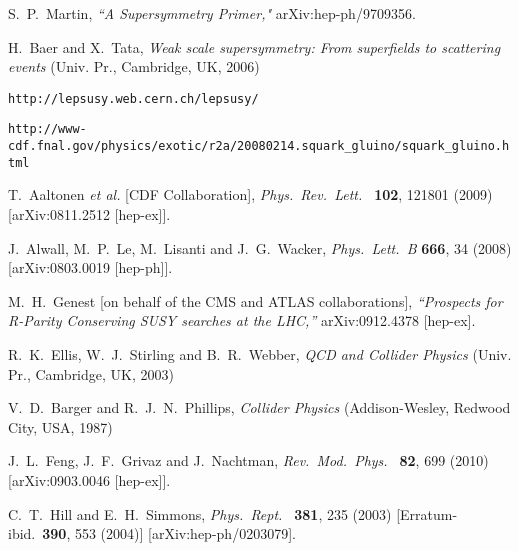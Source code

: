 \documentclass{ws-procs9x6}
\begin{document}
\begin{thebibliography}{99}
  S.~P.~Martin,
{\it ``A Supersymmetry Primer,"}
  arXiv:hep-ph/9709356.
  
  H.~Baer and X.~Tata,
{\it Weak scale supersymmetry: From superfields to scattering events}
(Univ. Pr., Cambridge, UK, 2006)  

{\tt http://lepsusy.web.cern.ch/lepsusy/}
  
{\tt  http://www-cdf.fnal.gov/physics/exotic/r2a/20080214.squark\_gluino/squark\_gluino.html}
  
  T.~Aaltonen {\it et al.}  [CDF Collaboration],
  {\em Phys.\ Rev.\ Lett.\ } {\bf 102}, 121801 (2009)
  [arXiv:0811.2512 [hep-ex]].
  
  J.~Alwall, M.~P.~Le, M.~Lisanti and J.~G.~Wacker,
{\em  Phys.\ Lett.\  B} {\bf 666}, 34 (2008)
  [arXiv:0803.0019 [hep-ph]].
  
  M.~H.~Genest  [on behalf of the CMS and ATLAS collaborations],
{\it ``Prospects for R-Parity Conserving SUSY searches at the LHC,''}
  arXiv:0912.4378 [hep-ex].
   
  R.~K.~Ellis, W.~J.~Stirling and B.~R.~Webber,
{\it QCD and Collider Physics} (Univ. Pr., Cambridge, UK, 2003)

  V.~D.~Barger and R.~J.~N.~Phillips,
{\it Collider Physics}
(Addison-Wesley, Redwood City, USA, 1987) 

  J.~L.~Feng, J.~F.~Grivaz and J.~Nachtman,
{\em  Rev.\ Mod.\ Phys.\ } {\bf 82}, 699 (2010)
  [arXiv:0903.0046 [hep-ex]].

 C.~T.~Hill and E.~H.~Simmons,
{\em  Phys.\ Rept.\ }  {\bf 381}, 235 (2003)
  [Erratum-ibid.\  {\bf 390}, 553 (2004)]
  [arXiv:hep-ph/0203079].
  

\end{thebibliography}
\end{document}
